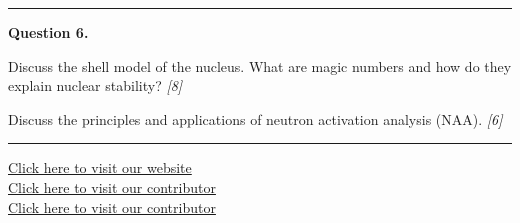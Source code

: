 \documentclass[11pt,a4paper]{article}
\newcommand{\pts}[1]{\hfill   \textit{[#1]}}
\begin{document}
\medskip\rule{\linewidth}{0.2pt}




\noindent   \textbf{Question 6.}

\begin{parts}
  \item Discuss the shell model of the nucleus. What are magic numbers and how do they explain nuclear stability? \pts{8}
  \item Discuss the principles and applications of neutron activation analysis (NAA). \pts{6}
\end{parts}

\vfill
\rule{\linewidth}{0.4pt}

\begin{center}\small
  \href{https://bhu-exam.vercel.app/}{Click here to visit our website}\\[4pt]
  \href{https://me-aryan.vercel.app/}{Click here to visit our contributor}\\[4pt]
  \href{https://quashan-me.vercel.app/}{Click here to visit our contributor}
\end{center}
\end{document}

